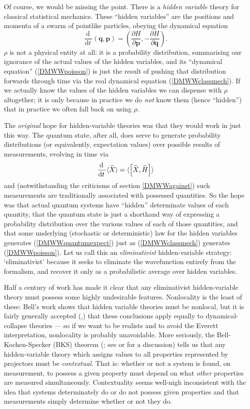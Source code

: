 \documentclass[12pt]{article}
\newcommand{\be}{\begin{equation}}
\newcommand{\ee}{\end{equation}}
\newcommand{\vctr}[1]{\ensuremath{\mathbf{ #1 }}}
\newcommand{\dr}[1]{\ensuremath{\mathrm{d} #1\,}}
\newcommand{\pbp}[2]{\ensuremath{\frac{\partial #1}{\partial #2}}}
\newcommand{\ddt}{\ensuremath{\frac{\dr{}}{\dr{t}}}}
\newcommand{\op}[1]{\ensuremath{\widehat{\textsf{\ensuremath{#1}}}}}
\newcommand{\comm}[2]{\ensuremath{\left[ #1 , #2 \right]}}
\begin{document}
Of course, we would be missing the point. There is a \emph{hidden variable} theory for classical statistical mechanics. These ``hidden variables'' are the positions and momenta of a swarm of pointlike particles, obeying the dynamical equation
\be\label{DMWWclassmech}
\ddt(\vctr{q},\vctr{p})=\left(\pbp{H}{\vctr{p}},-\pbp{H}{\vctr{q}}\right).
\ee
$\rho$ is not a physical entity at all: it is a probability distribution, summarising our ignorance of the actual values of the hidden variables, and its ``dynamical equation'' (\ref{DMWWpoisson}) is just the result of pushing that distribution forwards through time via the real dynamical equation (\ref{DMWWclassmech}). If we actually know the values of the hidden variables we can dispense with $\rho$ altogether; it is only because in practice we do \emph{not} know them (hence ``hidden'') that in practice we often fall back on using $\rho$.

The \emph{original} hope for hidden-variable theories was that they would work in just this way. The quantum state, after all, does serve to generate probability distributions (or equivalently, expectation values) over possible results of measurements, 
evolving in time via
\be\label{DMWWquantumexpect}
\ddt\langle\op{X}\rangle=\langle\comm{\op{X}}{\op{H}}\rangle
\ee
and (notwithstanding the criticisms of section \ref{DMWWagainst}) such measurements are traditionally associated with possessed quantities. So the hope was that actual quantum systems have ``hidden'' determinate values of each quantity, that the quantum state is just a shorthand way of expressing a probability distribution over the various values of each of those quantities, and that some underlying (stochastic or deterministic) law for the hidden variables generates (\ref{DMWWquantumexpect}) just as (\ref{DMWWclassmech}) generates (\ref{DMWWpoisson}). Let us call this an \emph{eliminativist} hidden-variable strategy: `eliminativist' because it seeks to eliminate the wavefunction entirely from the formalism, and recover it only as a probabilistic average over hidden variables.

Half a century of work has made it clear that any eliminativist hidden-variable theory must possess some highly undesirable features. Nonlocality is the least of these: Bell's work \cite{bellsocks} shows that hidden variable theories must be nonlocal, but it is fairly generally accepted (,) that these conclusions apply equally to dynamical-collapse theories --- so if we want to be realists and to avoid the Everett interpretation, nonlocality is probably unavoidable. More seriously, the Bell-Kochen-Specker (BKS) theorem (\cite{bell1966,kochenspecker}; see  or  for a discussion)  tells us that any hidden-variable theory which assigns values to all properties represented by projectors must be \emph{contextual}. That is: whether or not a system is found, on measurement, to possess a given property must depend on what \emph{other} properties are measured simultaneously. Contextuality seems well-nigh inconsistent with the idea that systems determinately do or do not possess given properties and that measurements simply determine whether or not they do.
\end{document}
